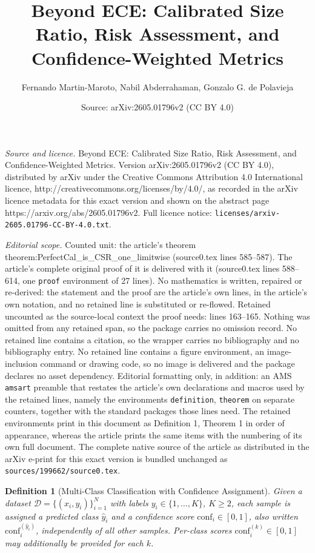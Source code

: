 \documentclass[10pt,a4paper]{amsart}
\title{Beyond ECE: Calibrated Size Ratio, Risk Assessment, and Confidence-Weighted Metrics}
\author{Fernando Martin-Maroto, Nabil Abderrahaman, Gonzalo G. de Polavieja}
\date{Source: arXiv:2605.01796v2 (CC BY 4.0)}
\newtheorem{definition}{Definition}
\begin{document}
\maketitle

\noindent\emph{Source and licence.} Beyond ECE: Calibrated Size Ratio, Risk Assessment, and Confidence-Weighted Metrics. Version arXiv:2605.01796v2 (CC BY 4.0), distributed by arXiv under the Creative Commons Attribution 4.0 International licence, http://creativecommons.org/licenses/by/4.0/, as recorded in the arXiv licence metadata for this exact version and shown on the abstract page https://arxiv.org/abs/2605.01796v2. Full licence notice: \texttt{licenses/arxiv-2605.01796-CC-BY-4.0.txt}.\par\smallskip

\noindent\textit{Editorial scope.} Counted unit: the article's theorem theorem:PerfectCal\_is\_CSR\_one\_limitwise (source0.tex lines 585--587). The article's complete original proof of it is delivered with it (source0.tex lines 588--614, one \texttt{proof} environment of 27 lines). No mathematics is written, repaired or re-derived: the statement and the proof are the article's own lines, in the article's own notation, and no retained line is substituted or re-flowed.  Retained uncounted as the source-local context the proof needs: lines 163--165.  Nothing was omitted from any retained span, so the package carries no omission record.  No retained line contains a citation, so the wrapper carries no bibliography and no bibliography entry.  No retained line contains a figure environment, an image-inclusion command or drawing code, so no image is delivered and the package declares no asset dependency.  Editorial formatting only, in addition: an AMS \texttt{amsart} preamble that restates the article's own declarations and macros used by the retained lines, namely the environments \texttt{definition}, \texttt{theorem} on separate counters, together with the standard packages those lines need.  The retained environments print in this document as Definition 1, Theorem 1 in order of appearance, whereas the article prints the same items with the numbering of its own full document.  The complete native source of the article as distributed in the arXiv e-print for this exact version is bundled unchanged as \texttt{sources/199662/source0.tex}.
\begin{definition}[Multi-Class Classification with Confidence Assignment] \label{def:conf_assignment_setup}
Given a dataset $\mathcal{D} = \{(x_i, y_i)\}_{i=1}^N$ with labels $y_i \in \{1, \ldots, K\}$, $K \geq 2$, each sample is assigned a predicted class $\hat{y}_i$ and a confidence score $\mathrm{conf}_i \in [0,1]$, also written $\mathrm{conf}_i^{(\hat{y}_i)}$, independently of all other samples. Per-class scores $\mathrm{conf}_i^{(k)} \in [0,1]$ may additionally be provided for each $k$.
\end{definition}
\end{document}
